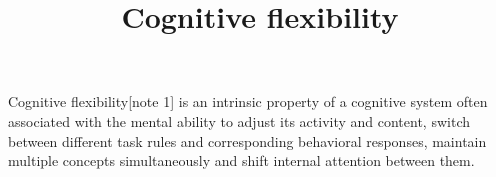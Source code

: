 \documentclass[a4paper]{article}
\title{Cognitive flexibility}
\date{}
\begin{document}
\maketitle
    Cognitive flexibility[note 1] is an intrinsic property of a cognitive system often associated with the mental ability to adjust its activity and content, switch between different task rules and corresponding behavioral responses, maintain multiple concepts simultaneously and shift internal attention between them. 
\end{document}

